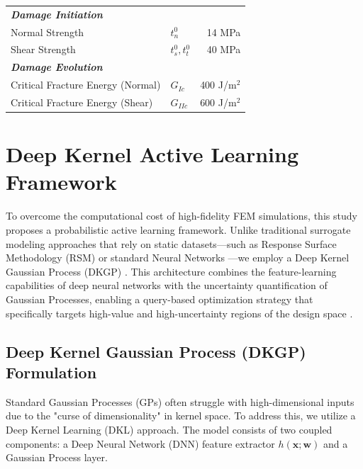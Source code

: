 \documentclass[
  preprint,
  12pt,
  a4paper
]{elsarticle}
\begin{document}
\begin{table}[htbp]
\begin{tabular}{l l r}
        \textit{\textbf{Damage Initiation}} & & \\
        Normal Strength & $t_n^0$ & 14 MPa \\
        Shear Strength & $t_s^0, t_t^0$ & 40 MPa \\
        
        \textit{\textbf{Damage Evolution}} & & \\
        Critical Fracture Energy (Normal) & $G_{Ic}$ & 400 J/m$^2$ \\
        Critical Fracture Energy (Shear) & $G_{IIc}$ & 600 J/m$^2$ \\
        \bottomrule
    \end{tabular}
\end{table}

\section{Deep Kernel Active Learning Framework}
\label{sec:AI_framework}

To overcome the computational cost of high-fidelity FEM simulations, this study proposes a probabilistic active learning framework. Unlike traditional surrogate modeling approaches that rely on static datasets—such as Response Surface Methodology (RSM) or standard Neural Networks \cite{queipo2005surrogate, luo2020surrogate}—we employ a Deep Kernel Gaussian Process (DKGP) \cite{wilson2016deep}. This architecture combines the feature-learning capabilities of deep neural networks with the uncertainty quantification of Gaussian Processes, enabling a query-based optimization strategy that specifically targets high-value and high-uncertainty regions of the design space \cite{ghosh2023digital}.

\subsection{Deep Kernel Gaussian Process (DKGP) Formulation}
Standard Gaussian Processes (GPs) often struggle with high-dimensional inputs due to the "curse of dimensionality" in kernel space. To address this, we utilize a Deep Kernel Learning (DKL) approach. The model consists of two coupled components: a Deep Neural Network (DNN) feature extractor $h(\mathbf{x}; \mathbf{w})$ and a Gaussian Process layer.
\end{document}
